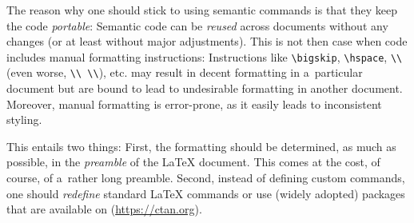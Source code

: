 The reason why one should stick to using semantic commands is that they keep the code \emph{portable}: Semantic code can be \emph{reused} across documents without any changes (or at least without major adjustments). This is not then case when code includes manual formatting instructions: Instructions like \verb|\bigskip|, \verb|\hspace|, \verb|\\| (even worse, \verb|\\ \\|), etc. may result in decent formatting in a~particular document but are bound to lead to undesirable formatting in another document. Moreover, manual formatting is error-prone, as it easily leads to inconsistent styling.

This entails two things: First, the formatting should be determined, as much as possible, in the \emph{preamble} of the LaTeX document. This comes at the cost, of course, of a~rather long preamble. Second, instead of defining custom commands, one should \emph{redefine} standard LaTeX commands or use (widely adopted) packages that are available on  (\url{https://ctan.org}).


